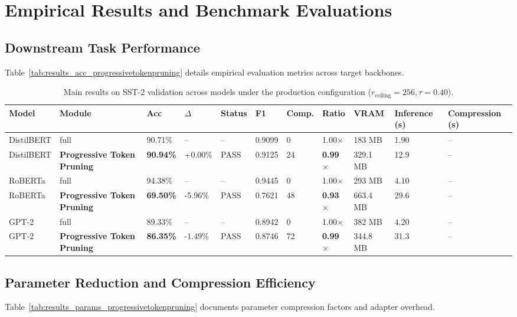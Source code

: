\section{Empirical Results and Benchmark Evaluations}

\subsection{Downstream Task Performance}
Table~\ref{tab:results_acc_progressivetokenpruning} details empirical evaluation metrics across target backbones.

\begin{table}[t]
\centering
\small
\begin{tabular}{lllllllllll}
\toprule
\textbf{Model} & \textbf{Module} & \textbf{Acc} & \textbf{$\Delta$} & \textbf{Status} & \textbf{F1} & \textbf{Comp.} & \textbf{Ratio} & \textbf{VRAM} & \textbf{Inference (s)} & \textbf{Compression (s)} \\
\midrule
DistilBERT & full & 90.71\% & -- & -- & 0.9099 & 0 & 1.00$\times$ & 183 MB & 1.90 & -- \\
DistilBERT & \textbf{Progressive Token Pruning} & \textbf{90.94\%} & +0.00\% & PASS & 0.9125 & 24 & \textbf{0.99$\times$} & 329.1 MB & 12.9 & -- \\
RoBERTa & full & 94.38\% & -- & -- & 0.9445 & 0 & 1.00$\times$ & 293 MB & 4.10 & -- \\
RoBERTa & \textbf{Progressive Token Pruning} & \textbf{69.50\%} & -5.96\% & PASS & 0.7621 & 48 & \textbf{0.93$\times$} & 663.4 MB & 29.6 & -- \\
GPT-2 & full & 89.33\% & -- & -- & 0.8942 & 0 & 1.00$\times$ & 382 MB & 4.20 & -- \\
GPT-2 & \textbf{Progressive Token Pruning} & \textbf{86.35\%} & -1.49\% & PASS & 0.8746 & 72 & \textbf{0.99$\times$} & 344.8 MB & 31.3 & -- \\
\bottomrule
\end{tabular}
\caption{Main results on SST-2 validation across models under the production configuration ($r_{\mathrm{ceiling}}=256, \tau=0.40$).}
\label{tab:main_sst2}
\end{table}

\subsection{Parameter Reduction and Compression Efficiency}
Table~\ref{tab:results_params_progressivetokenpruning} documents parameter compression factors and adapter overhead.

